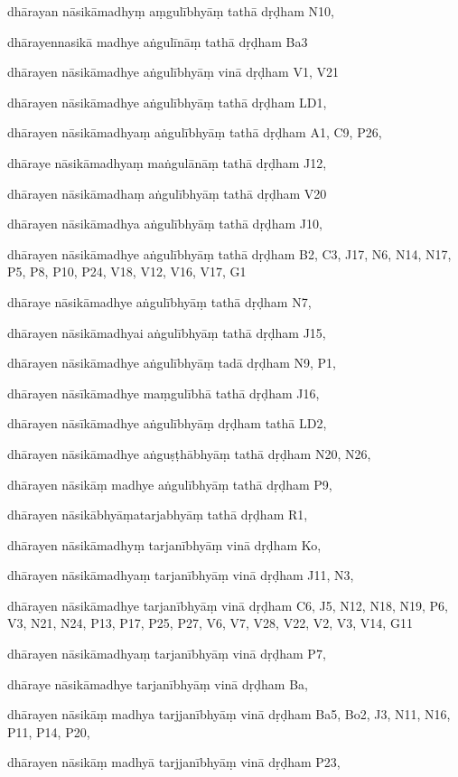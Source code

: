 \begin{marma}[hp02_009]
\begin{marma}[hp02_011]
\begin{marma}[hp02_65cd]
\item[dhārayan nāsikāmadhyṃ aṃgulībhyāṃ tathā dṛḍham] N10,
\item[dhārayennasikā madhye aṅgulīnāṃ tathā dṛḍham] Ba3
\item[dhārayen nāsikāmadhye aṅgulībhyāṃ vinā dṛḍham] V1, V21
\item[dhārayen nāsikāmadhye aṅgulībhyāṃ tathā dṛḍham] LD1,
\item[dhārayen nāsikāmadhyaṃ aṅgulībhyāṃ tathā dṛḍham] A1, C9, P26, 
\item[dhāraye nāsikāmadhyaṃ maṅgulānāṃ tathā dṛḍham] J12,
\item[dhārayen nāsikāmadhaṃ aṅgulībhyāṃ tathā dṛḍham] V20
\item[dhārayen nāsikāmadhya aṅgulībhyāṃ tathā dṛḍham] J10,
\item[dhārayen nāsikāmadhye aṅgulībhyāṃ tathā dṛḍham] B2, C3, J17, N6, N14, N17, P5, P8, P10, P24, V18, V12, V16, V17, G1
\item[dhāraye nāsikāmadhye aṅgulībhyāṃ tathā dṛḍham] N7, 
\item[dhārayen nāsikāmadhyai aṅgulībhyāṃ tathā dṛḍham] J15,
\item[dhārayen nāsikāmadhye aṅgulībhyāṃ tadā dṛḍham] N9, P1, 
\item[dhārayen nāsīkāmadhye maṃgulībhā tathā dṛḍham] J16,
\item[dhārayen nāsīkāmadhye aṅgulībhyāṃ dṛḍham tathā] LD2,
\item[dhārayen nāsikāmadhye aṅguṣṭhābhyāṃ tathā dṛḍham] N20, N26,
\item[dhārayen nāsikāṃ madhye aṅgulībhyāṃ tathā dṛḍham] P9, 
\item[dhārayen nāsikābhyāṃatarjabhyāṃ tathā dṛḍham] R1,
\item[dhārayen nāsikāmadhyṃ tarjanībhyāṃ vinā dṛḍham] Ko,
\item[dhārayen nāsikāmadhyaṃ tarjanībhyāṃ vinā dṛḍham] J11, N3, 
\item[dhārayen nāsikāmadhye tarjanībhyāṃ vinā dṛḍham] C6, J5, N12, N18, N19, P6, V3, N21, N24, P13, P17, P25, P27, V6, V7, V28, V22, V2, V3, V14, G11
\item[dhārayen nāsikāmadhyaṃ tarjanībhyāṃ vinā dṛḍham] P7,
\item[dhāraye nāsikāmadhye tarjanībhyāṃ vinā dṛḍham] Ba,
\item[dhārayen nāsikāṃ madhya tarjjanībhyāṃ vinā dṛḍham] Ba5, Bo2, J3, N11, N16, P11, P14, P20, 
\item[dhārayen nāsikāṃ madhyā tarjjanībhyāṃ vinā dṛḍham] P23,

\end{marma}
\end{marma}
\end{marma}
